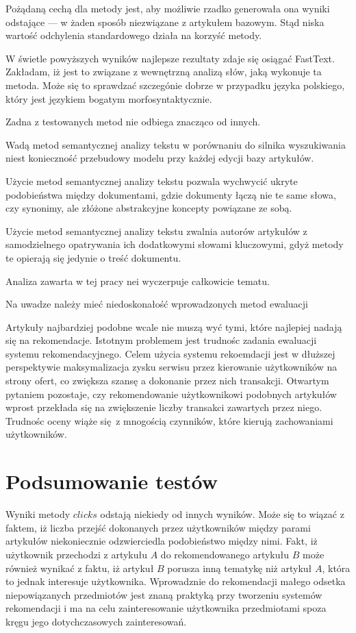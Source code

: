 \documentclass[pl]{minipw} %
\begin{document}
Pożądaną cechą dla metody jest, aby możliwie rzadko generowała ona wyniki odstające --- w żaden sposób niezwiązane z artykułem bazowym. Stąd niska wartość odchylenia standardowego działa na korzyść metody.

W świetle powyższych wyników najlepsze rezultaty zdaje się osiągać FastText. Zakładam, iż jest to związane z wewnętrzną analizą słów, jaką wykonuje ta metoda. Może się to sprawdzać szczegónie dobrze w przypadku języka polskiego, który jest językiem bogatym morfosyntaktycznie.

Zadna z testowanych metod nie odbiega znacząco od innych.

Wadą metod semantycznej analizy tekstu w porównaniu do silnika wyszukiwania niest konieczność przebudowy modelu przy każdej edycji bazy artykułów.

Użycie metod semantycznej analizy tekstu pozwala wychwycić ukryte podobieństwa między dokumentami, gdzie dokumenty łączą nie te same słowa, czy synonimy, ale złóżone abstrakcyjne koncepty powiązane ze sobą.

Użycie metod semantycznej analizy tekstu zwalnia autorów artykułów z samodzielnego opatrywania ich dodatkowymi słowami kluczowymi, gdyż metody te opierają się jedynie o treść dokumentu.

Analiza zawarta w tej pracy nei wyczerpuje całkowicie tematu. 

Na uwadze należy mieć niedoskonałość wprowadzonych metod ewaluacji

Artykuły najbardziej podobne wcale nie muszą wyć tymi, które najlepiej nadają się na rekomendacje. Istotnym problemem jest trudnośc zadania ewaluacji systemu rekomendacyjnego. Celem użycia systemu rekoemdacji jest w dłuższej perspektywie maksymalizacja zysku serwisu przez kierowanie użytkowników na strony ofert, co zwiększa szansę a dokonanie przez nich transakcji. Otwartym pytaniem pozostaje, czy rekomendowanie użytkownikowi podobnych artykułów wprost przekłada się na zwiększenie liczby transakci zawartych przez niego. Trudnośc oceny wiąże się z mnogością czynników, które kierują zachowaniami użytkowników.

\section{Podsumowanie testów}

Wyniki metody $clicks$ odstają niekiedy od innych wyników. Może się to wiązać z faktem, iż liczba przejść dokonanych przez użytkowników między parami artykułów niekoniecznie odzwierciedla podobieństwo między nimi. Fakt, iż użytkownik przechodzi z artykułu $A$ do rekomendowanego artykułu $B$ może również wynikać z faktu, iż artykuł $B$ porusza inną tematykę niż artykuł $A$, która to jednak interesuje użytkownika. Wprowadznie do rekomendacji małego odsetka niepowiązanych przedmiotów jest znaną praktyką przy tworzeniu systemów rekomendacji i ma na celu zainteresowanie użytkownika przedmiotami spoza kręgu jego dotychczasowych zainteresowań.
\end{document}
